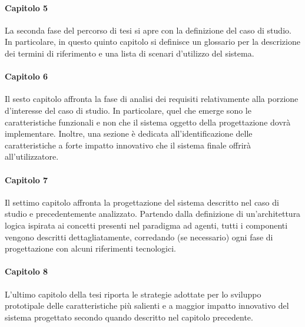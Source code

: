 \paragraph{Capitolo 5}
La seconda fase del percorso di tesi si apre con la definizione del caso di studio. In particolare, in questo quinto capitolo si definisce un glossario per la descrizione dei termini di riferimento e una lista di scenari d'utilizzo del sistema.

\paragraph{Capitolo 6}
Il sesto capitolo affronta la fase di analisi dei requisiti relativamente alla porzione d'interesse del caso di studio. In particolare, quel che emerge sono le caratteristiche funzionali e non che il sistema oggetto della progettazione dovrà implementare. Inoltre, una sezione è dedicata all'identificazione delle caratteristiche a forte impatto innovativo che il sistema finale offrirà all'utilizzatore. 

\paragraph{Capitolo 7}
Il settimo capitolo affronta la progettazione del sistema descritto nel caso di studio e precedentemente analizzato. Partendo dalla definizione di un'architettura logica ispirata ai concetti presenti nel paradigma ad agenti, tutti i componenti vengono descritti dettagliatamente, corredando (se necessario) ogni fase di progettazione con alcuni riferimenti tecnologici. 

\paragraph{Capitolo 8}
L'ultimo capitolo della tesi riporta le strategie adottate per lo sviluppo prototipale delle caratteristiche più salienti e a maggior impatto innovativo del sistema progettato secondo quando descritto nel capitolo precedente. 